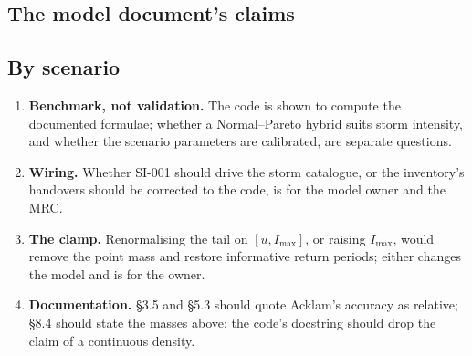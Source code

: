\documentclass[11pt,a4paper]{article}
\begin{document}


\subsection{The model document's claims}


\subsection{By scenario}



\mkmlimitations

\begin{enumerate}[leftmargin=*]
\item \textbf{Benchmark, not validation.} The code is shown to compute the documented
  formulae; whether a Normal--Pareto hybrid suits storm intensity, and whether the
  scenario parameters are calibrated, are separate questions.
\item \textbf{Wiring.} Whether SI-001 should drive the storm catalogue, or the
  inventory's handovers should be corrected to the code, is for the model owner and
  the MRC.
\item \textbf{The clamp.} Renormalising the tail on $[u,I_{\max}]$, or raising
  $I_{\max}$, would remove the point mass and restore informative return periods;
  either changes the model and is for the owner.
\item \textbf{Documentation.} \S3.5 and \S5.3 should quote Acklam's accuracy as
  relative; \S8.4 should state the masses above; the code's docstring should drop
  the claim of a continuous density.
\end{enumerate}

\end{document}
